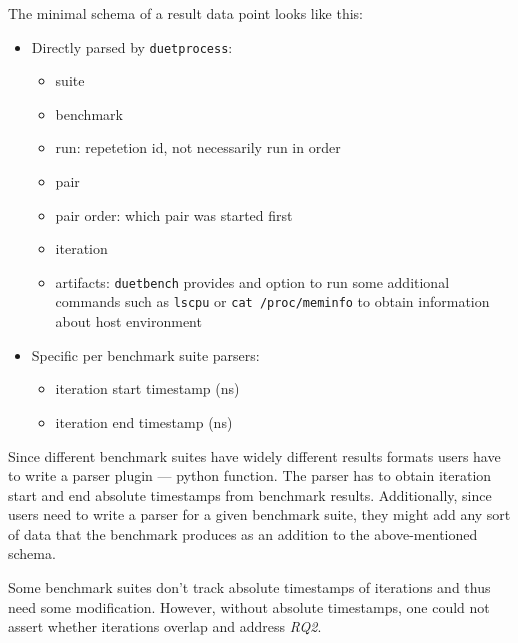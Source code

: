 The minimal schema of a result data point looks like this:
\begin{itemize}
    \item Directly parsed by \lstinline{duetprocess}:
        \begin{itemize}
            \item suite
            \item benchmark
            \item run: repetetion id, not necessarily run in order
            \item pair
            \item pair order: which pair was started first
            \item iteration
            \item artifacts: \lstinline{duetbench} provides and option to run some additional commands such as \lstinline{lscpu} or \lstinline{cat /proc/meminfo} to obtain information about host environment
        \end{itemize}
    \item Specific per benchmark suite parsers:
        \begin{itemize}
            \item iteration start timestamp (ns)
            \item iteration end timestamp (ns)
        \end{itemize}
\end{itemize}

Since different benchmark suites have widely different results formats users have to write a parser plugin --- python function.
The parser has to obtain iteration start and end absolute timestamps from benchmark results. 
Additionally, since users need to write a parser for a given benchmark suite, they might add any sort of data that the benchmark produces as an addition to the above-mentioned schema.

Some benchmark suites don't track absolute timestamps of iterations and thus need some modification.
However, without absolute timestamps, one could not assert whether iterations overlap and address \emph{RQ2}.
